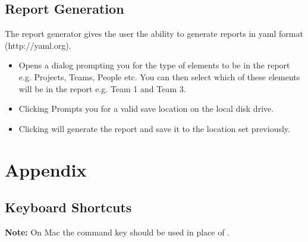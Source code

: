 \documentclass[11pt,fleqn]{book} %
\begin{document}
\section{Report Generation}
The report generator gives the user the ability to generate reports in yaml format (http://yaml.org).
\begin{itemize}
  \item {} Opens a dialog prompting you for the type of elements to be in the report
  e.g. Projects, Teams, People etc. You can then select which of these elements will be in the report e.g. Team 1 and
  Team 3.
  \item Clicking  Prompts you for a valid save location on the local disk drive.
  \item Clicking  will generate the report and save it to the location set previously.
\end{itemize}



\appendix
\chapter{Appendix}


\section{Keyboard Shortcuts}

\textbf{Note:} On Mac the command key \keys{\cmd} should be used
  in place of \keys{\ctrl}.
\end{document}

